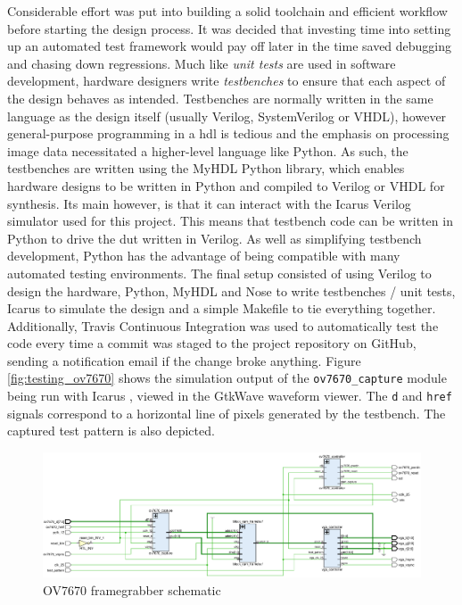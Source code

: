 \documentclass[a4paper]{report}
\begin{document}
Considerable effort was put into building a solid toolchain and efficient workflow before starting the design process. It was decided that investing time into setting up an automated test framework would pay off later in the time saved debugging and chasing down regressions. Much like \textit{unit tests} are used in software development, hardware designers write \textit{testbenches} to ensure that each aspect of the design behaves as intended. Testbenches are normally written in the same language as the design itself (usually Verilog, SystemVerilog or VHDL), however general-purpose programming in a \gls{hdl} is tedious and the emphasis on processing image data necessitated a higher-level language like Python. As such, the testbenches are written using the MyHDL Python library, which enables hardware designs to be written in Python and compiled to Verilog or VHDL for synthesis. Its main however, is that it can interact with the Icarus Verilog simulator used for this project. This means that testbench code can be written in Python to drive the \gls{dut} written in Verilog. As well as simplifying testbench development, Python has the advantage of being compatible with many automated testing environments. The final setup consisted of using Verilog to design the hardware, Python, MyHDL and Nose to write testbenches / unit tests, Icarus to simulate the design and a simple Makefile to tie everything together. Additionally, Travis Continuous Integration was used to automatically test the code every time a commit was staged to the project repository on GitHub, sending a notification email if the change broke anything. Figure \ref{fig:testing_ov7670} shows the simulation output of the \texttt{ov7670\_capture} module being run with Icarus , viewed in the GtkWave waveform viewer. The \texttt{d} and \texttt{href} signals correspond to a horizontal line of pixels generated by the testbench. The captured test pattern is also depicted.

\begin{figure}
  \centering
  \includegraphics[width=1\textwidth]{ov7670_schematic.png}
  \caption{OV7670 framegrabber schematic}
  \label{fig:ov7670_schematic}
\end{figure}
\end{document}
